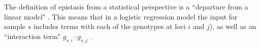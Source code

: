 %


%


The definition of epistasis from a statistical perspective is a ``departure from a linear model" \cite{cordell2009detecting}. This means that in a logistic regression model the input for sample $s$ includes terms with each of the genotypes at loci $i$ and $j$), as well as an ``interaction term" $g_{s,i} \cdot g_{s,j}$ \cite{cordell2002epistasis}. 

